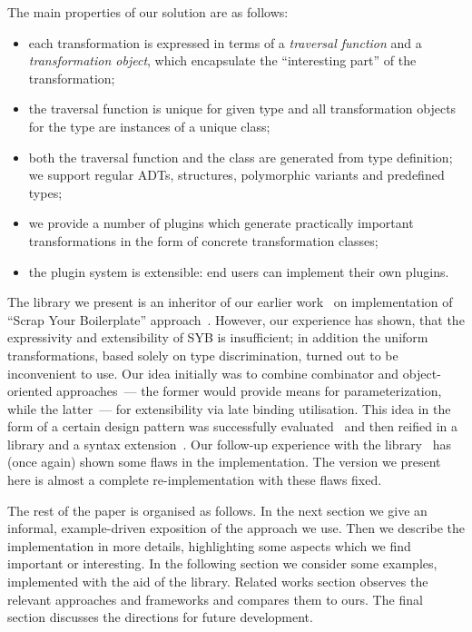 The main properties of our solution are as follows:

\begin{itemize}
\item each transformation is expressed in terms of a \emph{traversal function} and a \emph{transformation object}, which encapsulate the ``interesting part''
  of the transformation;
\item the traversal function is unique for given type and all transformation objects for the type are instances of a unique class;
\item both the traversal function and the class are generated from type definition; we support regular ADTs, structures, polymorphic variants and predefined types;
\item we provide a number of plugins which generate practically important transformations in the form of concrete transformation classes;
\item the plugin system is extensible: end users can implement their own plugins.
\end{itemize}

The library we present is an inheritor of our earlier work~\cite{SYBOCaml} on implementation of ``Scrap Your Boilerplate'' approach~\cite{SYB,SYB1,SYB2}. However,
our experience has shown, that the expressivity and extensibility of SYB is insufficient; in addition the uniform transformations, based solely on type discrimination, turned out to be
inconvenient to use. Our idea initially was to combine combinator and object-oriented approaches~--- the former would provide means for parameterization, while the
latter~--- for extensibility via late binding utilisation. This idea in the form of a certain design pattern was successfully evaluated~\cite{SCICO} and then reified
in a library and a syntax extension~\cite{TransformationObjects}. Our follow-up experience with the library~\cite{OCanren} has (once again) shown some flaws in the
implementation. The version we present here is almost a complete re-implementation with these flaws fixed.

The rest of the paper is organised as follows. In the next section we give an informal, example-driven exposition of
the approach we use. Then we describe the implementation in more details, highlighting some aspects which we find important or
interesting. In the following section we consider some examples, implemented with the aid of the library. Related works
section observes the relevant approaches and frameworks and compares them to ours. The final section discusses the directions for
future development.


